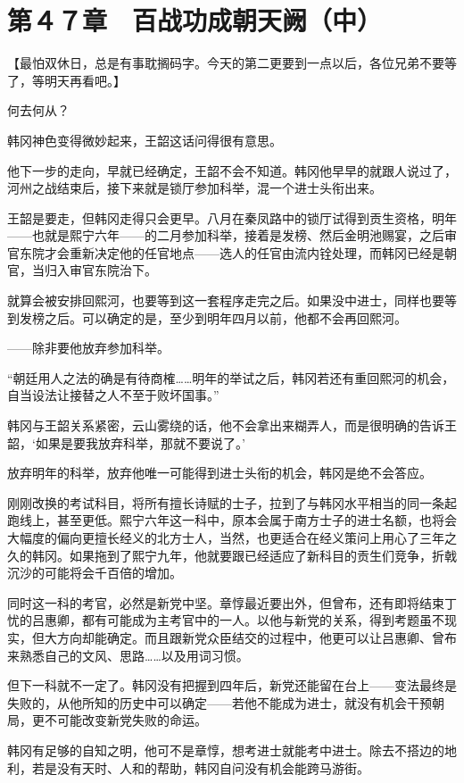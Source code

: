 \section{第４７章　百战功成朝天阙（中） }

【最怕双休日，总是有事耽搁码字。今天的第二更要到一点以后，各位兄弟不要等了，等明天再看吧。】

何去何从？

韩冈神色变得微妙起来，王韶这话问得很有意思。

他下一步的走向，早就已经确定，王韶不会不知道。韩冈他早早的就跟人说过了，河州之战结束后，接下来就是锁厅参加科举，混一个进士头衔出来。

王韶是要走，但韩冈走得只会更早。八月在秦凤路中的锁厅试得到贡生资格，明年——也就是熙宁六年——的二月参加科举，接着是发榜、然后金明池赐宴，之后审官东院才会重新决定他的任官地点——选人的任官由流内铨处理，而韩冈已经是朝官，当归入审官东院治下。

就算会被安排回熙河，也要等到这一套程序走完之后。如果没中进士，同样也要等到发榜之后。可以确定的是，至少到明年四月以前，他都不会再回熙河。

——除非要他放弃参加科举。

“朝廷用人之法的确是有待商榷……明年的举试之后，韩冈若还有重回熙河的机会，自当设法让接替之人不至于败坏国事。”

韩冈与王韶关系紧密，云山雾绕的话，他不会拿出来糊弄人，而是很明确的告诉王韶，‘如果是要我放弃科举，那就不要说了。’

放弃明年的科举，放弃他唯一可能得到进士头衔的机会，韩冈是绝不会答应。

刚刚改换的考试科目，将所有擅长诗赋的士子，拉到了与韩冈水平相当的同一条起跑线上，甚至更低。熙宁六年这一科中，原本会属于南方士子的进士名额，也将会大幅度的偏向更擅长经义的北方士人，当然，也更适合在经义策问上用心了三年之久的韩冈。如果拖到了熙宁九年，他就要跟已经适应了新科目的贡生们竞争，折戟沉沙的可能将会千百倍的增加。

同时这一科的考官，必然是新党中坚。章惇最近要出外，但曾布，还有即将结束丁忧的吕惠卿，都有可能成为主考官中的一人。以他与新党的关系，得到考题虽不现实，但大方向却能确定。而且跟新党众臣结交的过程中，他更可以让吕惠卿、曾布来熟悉自己的文风、思路……以及用词习惯。

但下一科就不一定了。韩冈没有把握到四年后，新党还能留在台上——变法最终是失败的，从他所知的历史中可以确定——若他不能成为进士，就没有机会干预朝局，更不可能改变新党失败的命运。

韩冈有足够的自知之明，他可不是章惇，想考进士就能考中进士。除去不搭边的地利，若是没有天时、人和的帮助，韩冈自问没有机会能跨马游街。

